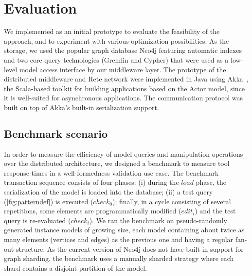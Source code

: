 \chapter{Evaluation}
\label{sec:evaluation}


We implemented \iqd{} as an initial prototype to evaluate the feasibility of the approach, and to experiment with various optimization possibilities. As the storage, we used the popular graph database Neo4j \cite{neo4j} featuring automatic indexes and two core query technologies (Gremlin and Cypher) that were used as a low-level model access interface by our middleware layer. %
The prototype of the distributed middleware and Rete network were implemented in Java using Akka~\cite{akka}, the Scala-based toolkit for building applications based on the Actor model, since it is well-suited for asynchronous applications. The communication protocol was built on top of Akka's built-in serialization support.






\section{Benchmark scenario}

\label{benchmark}
In order to measure the efficiency of model queries and manipulation operations over the distributed architecture, we designed a benchmark to measure tool response times in a well-formedness validation use case. The benchmark transaction sequence consists of four phases: (i) during the $load$ phase, the serialization of the model is loaded into the database; (ii) a test query (\autoref{fig:patterndef}) is executed ($check_0$); finally, in a cycle consisting of several repetitions, some elements are programmatically modified ($edit_i$) and the test query is re-evaluated ($check_i$). We ran the benchmark on pseudo-randomly generated instance models of growing size, each model containing about twice as many elements (vertices and edges) as the previous one and having a regular fan-out structure. As the current version of Neo4j does not have built-in support for graph sharding, the benchmark uses a manually sharded strategy where each shard contains a disjoint partition of the model.



